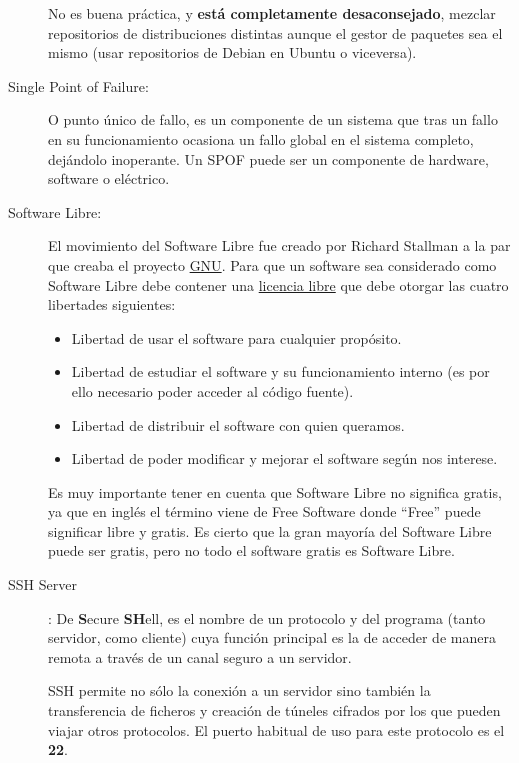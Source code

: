 \begin{description}
    No es buena práctica, y \textbf{está completamente desaconsejado}, mezclar repositorios de distribuciones distintas aunque el gestor de paquetes sea el mismo (usar repositorios de Debian en Ubuntu o viceversa).


    \hypertarget{spf}{}
    \item[Single Point of Failure:] O punto único de fallo, es un componente de un sistema que tras un fallo en su funcionamiento ocasiona un fallo global en el sistema completo, dejándolo inoperante. Un SPOF puede ser un componente de hardware, software o eléctrico.


    \hypertarget{software_libre}{}
    \item[Software Libre:] El movimiento del Software Libre fue creado por Richard Stallman a la par que creaba el proyecto \hyperlink{gnu}{GNU}. Para que un software sea considerado como Software Libre debe contener una \hyperlink{licencias_libres}{licencia libre} que debe otorgar las cuatro libertades siguientes:
    \begin{itemize}
        \item Libertad de usar el software para cualquier propósito.
        \item Libertad de estudiar el software y su funcionamiento interno (es por ello necesario poder acceder al código fuente).
        \item Libertad de distribuir el software con quien queramos.
        \item Libertad de poder modificar y mejorar el software según nos interese.
    \end{itemize}

    Es muy importante tener en cuenta que Software Libre no significa gratis, ya que en inglés el término viene de Free Software donde “Free” puede significar libre y gratis. Es cierto que la gran mayoría del Software Libre puede ser gratis, pero no todo el software gratis es Software Libre.


    \hypertarget{ssh_server}{}
    \item [SSH Server]: De \textbf{S}ecure \textbf{SH}ell, es el nombre de un protocolo y del programa (tanto servidor, como cliente) cuya función principal es la de acceder de manera remota a través de un canal seguro a un servidor.

    SSH permite no sólo la conexión a un servidor sino también la transferencia de ficheros y creación de túneles cifrados por los que pueden viajar otros protocolos. El puerto habitual de uso para este protocolo es el \textbf{22}.



\end{description}
